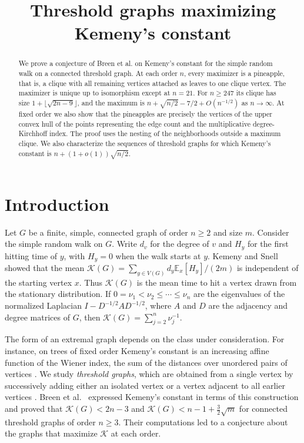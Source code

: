 \documentclass[11pt]{amsart}
\title[Threshold graphs maximizing Kemeny's constant]{Threshold graphs maximizing Kemeny's constant}
\date{}
\numberwithin{equation}{section}
\newcommand{\K}{\mathcal K}
\begin{document}
\begin{abstract}
We prove a conjecture of Breen et al. on Kemeny's constant for the
simple random walk on a connected threshold graph. At each order $n$,
every maximizer is a pineapple, that is, a clique with all remaining
vertices attached as leaves to one clique vertex. The maximizer is
unique up to isomorphism except at $n=21$. For $n\ge247$ its clique
has size $1+\lfloor\sqrt{2n-9}\rfloor$, and the maximum is
$n+\sqrt{n/2}-7/2+O(n^{-1/2})$ as $n\to\infty$.
At fixed order we also show that the pineapples are
precisely the vertices of the upper convex hull of the points
representing the edge count and the multiplicative degree-Kirchhoff
index. The proof uses the nesting of the neighborhoods outside a
maximum clique. We also characterize the sequences of threshold
graphs for which Kemeny's constant is $n+(1+o(1))\sqrt{n/2}$.
\end{abstract}
\maketitle

\section{Introduction}\label{sec:intro}

Let $G$ be a finite, simple, connected graph of order $n\ge2$ and
size $m$. Consider the simple random walk on $G$. Write $d_v$ for the
degree of $v$ and $H_y$ for the first hitting time of $y$, with $H_y=0$
when the walk starts at $y$. Kemeny and Snell \cite{KS} showed that
the mean $\K(G)=\sum_{y\in V(G)}d_y\mathbb E_x[H_y]/(2m)$ is
independent of the starting vertex $x$. Thus $\K(G)$ is the mean time
to hit a vertex drawn from the stationary distribution. If
$0=\nu_1<\nu_2\le\cdots\le\nu_n$ are the eigenvalues of the
normalized Laplacian $I-D^{-1/2}AD^{-1/2}$, where $A$ and $D$ are the
adjacency and degree matrices of $G$, then
$\K(G)=\sum_{j=2}^n\nu_j^{-1}$.

The form of an extremal graph depends on the class under
consideration. For instance, on trees of fixed order Kemeny's constant
is an increasing affine function of the Wiener index, the sum of the
distances over unordered pairs of vertices \cite{JKS}. We study
\emph{threshold graphs}, which are obtained from a single vertex by
successively adding either an isolated vertex or a vertex adjacent to
all earlier vertices \cite{MP}. Breen et al.\ \cite{Breen} expressed
Kemeny's constant in terms of this construction and proved that
$\K(G)<2n-3$ and $\K(G)<n-1+\tfrac32\sqrt m$ for connected
threshold graphs of order $n\ge3$. Their computations led to a
conjecture about the graphs that maximize $\K$ at each order.
\end{document}
